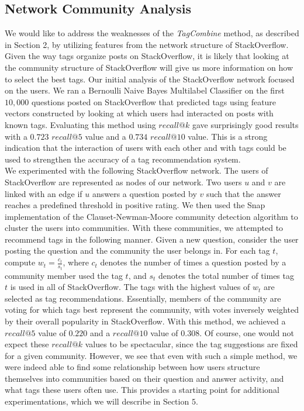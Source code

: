 \documentclass[10pt, final]{article}
\newcommand{\br}[1][.75]{\ \\[#1\baselineskip]}
\begin{document}
\subsection{Network Community Analysis}

We would like to address the weaknesses of the \textit{TagCombine} method, as described in Section 2, by utilizing features from the network structure of StackOverflow. Given the way tags organize posts on StackOverflow, it is likely that looking at the community structure of StackOverflow will give us more information on how to select the best tags. Our initial analysis of the StackOverflow network focused on the users. We ran a Bernoulli Naive Bayes Multilabel Classifier on the first $10,000$ questions posted on StackOverflow that predicted tags using feature vectors constructed by looking at which users had interacted on posts with known tags. Evaluating this method using $recall@k$ gave surprisingly good results with a $0.723$ $recall@5$ value and a $0.734$ $recall@10$ value. This is a strong indication that the interaction of users with each other and with tags could be used to strengthen the accuracy of a tag recommendation system.\br
We experimented with the following StackOverflow network. The users of StackOverflow are represented as nodes of our network. Two users $u$ and $v$ are linked with an edge if $u$ answers a question posted by $v$ such that the answer reaches a predefined threshold in positive rating. We then used the Snap implementation of the Clauset-Newman-Moore community detection algorithm to cluster the users into communities. With these communities, we attempted to recommend tags in the following manner. Given a new question, consider the user posting the question and the community the user belongs in. For each tag $t$, compute $w_t = \frac{c_t}{s_t}$, where $c_t$ denotes the number of times a question posted by a community member used the tag $t$, and $s_t$ denotes the total number of times tag $t$ is used in all of StackOverflow. The tags with the highest values of $w_t$ are selected as tag recommendations. Essentially, members of the community are voting for which tags best represent the community, with votes inversely weighted by their overall popularity in StackOverflow. With this method, we achieved a $recall@5$ value of $0.220$ and a $recall@10$ value of $0.308$. Of course, one would not expect these $recall@k$ values to be spectacular, since the tag suggestions are fixed for a given community. However, we see that even with such a simple method, we were indeed able to find some relationship between how users structure themselves into communities based on their question and answer activity, and what tags these users often use. This provides a starting point for additional experimentations, which we will describe in Section $5$.\br
\end{document}
